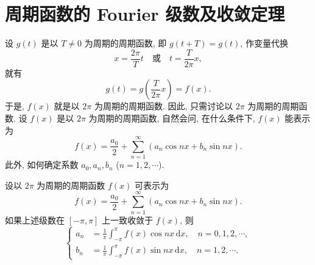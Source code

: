 
\section{周期函数的 Fourier 级数及收敛定理}\label{sec:16.1}

设 $g(t)$ 是以 $T\neq 0$ 为周期的周期函数, 即 $g(t+T)=g(t)$, 作变量代换
\[
  x=\frac{2\pi}{T}t\quad\text{或}\quad t=\frac{T}{2\pi}x,
\]
就有
\[
  g(t)=g\left(\frac{T}{2\pi}x\right)=f(x).
\]
于是, $f(x)$ 就是以 $2\pi$ 为周期的周期函数. 因此, 只需讨论以 $2\pi$ 为周期的周期函数. 设 $f(x)$ 是以 $2\pi$ 为周期的周期函数, 自然会问, 在什么条件下, $f(x)$ 能表示为
\[
  f(x)=\frac{a_{0}}{2}+\sum_{n=1}^{\infty}(a_{n}\cos nx+b_{n}\sin nx).
\]
此外, 如何确定系数 $a_{0}, a_{n}, b_{n}$ ($n=1,2,\cdots$).

\begin{theorem}\label{thm:16.1.1}
设以 $2\pi$ 为周期的周期函数 $f(x)$ 可表示为
\[
  f(x)=\frac{a_{0}}{2}+\sum_{n=1}^{\infty}(a_{n}\cos nx+b_{n}\sin nx).
\]
如果上述级数在 $[-\pi,\pi]$ 上一致收敛于 $f(x)$, 则
\[
  \left\{\begin{aligned}
    a_{n}&=\frac{1}{\pi}\int_{-\pi}^{\pi}f(x)\cos nx\,\mathrm{d}x,\quad n=0,1,2,\cdots,\\
    b_{n}&=\frac{1}{\pi}\int_{-\pi}^{\pi}f(x)\sin nx\,\mathrm{d}x,\quad n=1,2,\cdots.
  \end{aligned}\right.
\]
\end{theorem}

